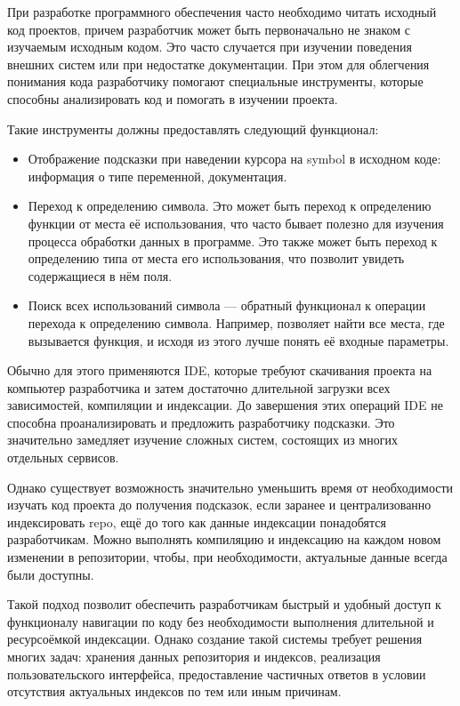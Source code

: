 
При разработке программного обеспечения часто необходимо читать исходный код проектов, причем разработчик может быть первоначально не знаком с изучаемым исходным кодом. Это часто случается при изучении поведения внешних систем или при недостатке документации. При этом для облегчения понимания кода разработчику помогают специальные инструменты, которые способны анализировать код и помогать в изучении проекта.

Такие инструменты должны предоставлять следующий функционал:
\begin{itemize}
    \item Отображение подсказки при наведении курсора на \gls{symbol} в исходном коде: информация о типе переменной, документация.
    \item Переход к определению символа. Это может быть переход к определению функции от места её использования, что часто бывает полезно для изучения процесса обработки данных в программе. Это также может быть переход к определению типа от места его использования, что позволит увидеть содержащиеся в нём поля.
    \item Поиск всех использований символа — обратный функционал к операции перехода к определению символа. Например, позволяет найти все места, где вызывается функция, и исходя из этого лучше понять её входные параметры.
\end{itemize}

Обычно для этого применяются \gls{IDE}, которые требуют скачивания проекта на компьютер разработчика и затем достаточно длительной загрузки всех зависимостей, компиляции и индексации. До завершения этих операций IDE не способна проанализировать и предложить разработчику подсказки. Это значительно замедляет изучение сложных систем, состоящих из многих отдельных сервисов.

Однако существует возможность значительно уменьшить время от необходимости изучать код проекта до получения подсказок, если заранее и централизованно индексировать \gls{repo}, ещё до того как данные индексации понадобятся разработчикам. Можно выполнять компиляцию и индексацию на каждом новом изменении в репозитории, чтобы, при необходимости, актуальные данные всегда были доступны.

Такой подход позволит обеспечить разработчикам быстрый и удобный доступ к функционалу навигации по коду без необходимости выполнения длительной и ресурсоёмкой индексации. Однако создание такой системы требует решения многих задач: хранения данных репозитория и индексов, реализация пользовательского интерфейса, предоставление частичных ответов в условии отсутствия актуальных индексов по тем или иным причинам.

